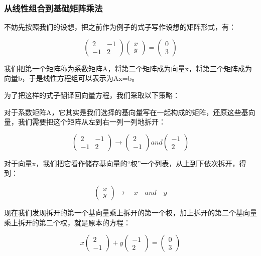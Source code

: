 \documentclass[12.8pt,a4paper,numbering = AMSalpha]{book}
\begin{document}
\subsubsection{从线性组合到基础矩阵乘法}

不妨先按照我们的设想，把之前作为例子的式子写作设想的矩阵形式，有：

\[
\begin{pmatrix}
	2&-1\\
	-1&2
\end{pmatrix}
\begin{pmatrix}
	x\\
	y
\end{pmatrix}
=
\begin{pmatrix}
	0\\
	3
\end{pmatrix}
\]

我们把第一个矩阵称为系数矩阵A，将第二个矩阵成为向量x，将第三个矩阵成为向量b，于是线性方程组可以表示为Ax=b。

为了把这样的式子翻译回向量方程，我们采取以下策略：

对于系数矩阵A，它其实是我们选择的基向量写在一起构成的矩阵，还原这些基向量，我们需要把这个矩阵从左到右一列一列地拆开：

\[
\begin{pmatrix}
	2&-1\\
	-1&2
\end{pmatrix}
\rightarrow
\begin{pmatrix}
	2\\
	-1
\end{pmatrix}
and
\begin{pmatrix}
	-1\\
	2
\end{pmatrix}
\]

对于向量x，我们把它看作储存基向量的“权”一个列表，从上到下依次拆开，得到：

\[
\begin{pmatrix}
	x\\
	y
\end{pmatrix}
\rightarrow
\quad x \quad and \quad y
\]

现在我们发现拆开的第一个基向量乘上拆开的第一个权，加上拆开的第二个基向量乘上拆开的第二个权，就是原本的方程：

\[
x
\begin{pmatrix}
	2\\
	-1
\end{pmatrix}
+y
\begin{pmatrix}
	-1\\
	2
\end{pmatrix}
=
\begin{pmatrix}
	0\\
	3
\end{pmatrix}
\]
\end{document}
